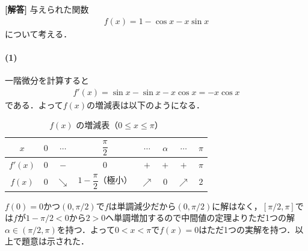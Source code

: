 \documentclass[../../main.tex]{subfiles}
\begin{document}
\begin{oframed}
  
\end{oframed}

{\bf [解答]}
与えられた関数
\begin{align}
  f(x)=1-\cos x-x\sin x \label{eq:1}
\end{align}
について考える．

\paragraph{(1)}

一階微分を計算すると
\begin{align}
  f'(x)=\sin x -\sin x -x\cos x = -x\cos x \label{eq:2}
\end{align}
である．よって$f(x)$の増減表は以下のようになる．

\begin{table}[htb]
  \centering
  \caption{$f(x)$ の増減表（$0 \le x \le \pi$）}
  \label{tab:f_x_trig}
  \begin{tabular}{c|ccccccc}
    $x$ & $0$ & $\cdots$ & $\dfrac{\pi}{2}$ & $\cdots$ & $\alpha$ & $\cdots$ & $\pi$ \\ \hline
    $f'(x)$ & $0$ & $-$ & $0$ & $+$ & $+$ & $+$ & $\pi$ \\ \hline
    $f(x)$ & $0$ & $\searrow$ & $1 - \dfrac{\pi}{2}$（極小） & $\nearrow$ & $0$ & $\nearrow$ & $2$
  \end{tabular}
\end{table}

$f(0)=0$かつ$(0,\pi/2)$で$f$は単調減少だから$(0,\pi/2)$に解はなく，$[\pi/2,\pi]$では$f$が$1-\pi/2<0$から$2>0$へ単調増加するので中間値の定理よりただ1つの解$\alpha\in(\pi/2,\pi)$を持つ．よって$0<x<\pi$で$f(x)=0$はただ1つの実解を持つ．以上で題意は示された．
\end{document}
